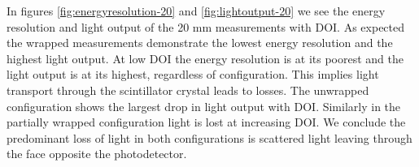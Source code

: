 In figures \ref{fig:energyresolution-20} and \ref{fig:lightoutput-20} we see the energy resolution and light output of the 20 mm measurements with DOI. As expected the wrapped measurements demonstrate the lowest energy resolution and the highest light output.  At low DOI the energy resolution is at its poorest and the light output is at its highest, regardless of configuration. This implies light transport through the scintillator crystal leads to losses. The unwrapped configuration shows the largest drop in light output with DOI. Similarly in the partially wrapped configuration light is lost at increasing DOI. We conclude the predominant loss of light in both configurations is scattered light leaving through the face opposite the photodetector.